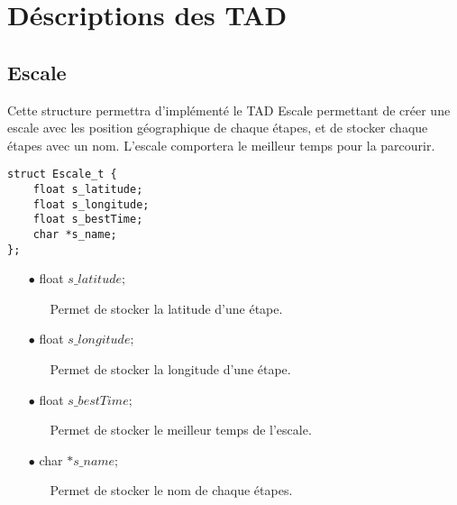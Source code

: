 \documentclass[a4paper, 11pt, oneside]{article}
\begin{document}
		\footnotetext{\textcolor{red}{Nom des opérations interne}}
		\footnotetext{\textcolor{green}{Arguments}}
		\footnotetext{\textcolor{blue}{Types de retour}}
		\footnotetext{\textcolor{magenta}{Nom des opérations d'observation}}

	\newpage

\section{Déscriptions des TAD}

	\subsection{Escale}

	Cette structure permettra d'implémenté le TAD Escale permettant de créer une escale avec les position géographique de chaque étapes,
	et de stocker chaque étapes avec un nom.
	L'escale comportera le meilleur temps pour la parcourir.

		\begin{lstlisting}
struct Escale_t {
	float s_latitude;
	float s_longitude;
	float s_bestTime;
	char *s_name;
};
		\end{lstlisting}

		\begin{itemize}
			\item[$\bullet$] float $s\_latitude;$
			\begin{itemize}
				\item[] Permet de stocker la latitude d'une étape.
			\end{itemize}
			\item[$\bullet$] float $s\_longitude;$
			\begin{itemize}
				\item[] Permet de stocker la longitude d'une étape.
			\end{itemize}
			\item[$\bullet$] float $s\_bestTime;$
			\begin{itemize}
				\item[] Permet de stocker le meilleur temps de l'escale.
			\end{itemize}
			\item[$\bullet$] char $*s\_name;$
			\begin{itemize}
				\item[] Permet de stocker le nom de chaque étapes.
			\end{itemize}
		\end{itemize}
\end{document}
